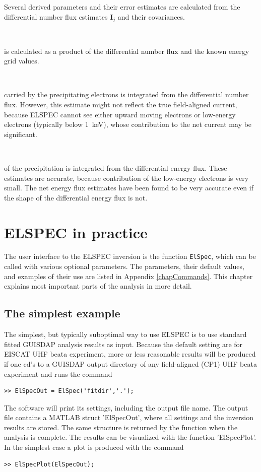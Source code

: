 \documentclass[12pt,a4paper]{report}
\begin{document}
Several derived parameters and their error estimates are calculated from the differential number flux estimates $\bm{I}_j$ and their covariances. 

~

 is calculated as a product of the differential number flux and the known energy grid values. 

~

 carried by the precipitating electrons is integrated from the differential number flux. However, this estimate might not reflect the true field-aligned current, because ELSPEC cannot see either upward moving electrons or low-energy electrons (typically below 1~keV), whose contribution to the net current may be significant.

~

 of the precipitation is integrated from the differential energy flux. These estimates are accurate, because contribution of the low-energy electrons is very small. The net energy flux estimates have been found to be very accurate even if the shape of the differential energy flux is not. 





\chapter{ELSPEC in practice}

The user interface to the ELSPEC inversion is the function \verb|ElSpec|, which can be called with various optional parameters. The parameters, their default values, and examples of their use are listed in Appendix \ref{chapCommands}. This chapter explains most important parts of the analysis in more detail. 


\section{The simplest example}

The simplest, but typically suboptimal way to use ELSPEC is to use standard fitted GUISDAP analysis results as input. Because the default setting are for EISCAT UHF beata experiment, more or less reasonable results will be produced if one cd's to a GUISDAP output directory of any field-aligned (CP1) UHF beata experiment and runs the command
\begin{lstlisting}[style=myMATLAB]
>> ElSpecOut = ElSpec('fitdir','.');
\end{lstlisting}
The software will print its settings, including the output file name. The output file contains a MATLAB struct 'ElSpecOut', where all settings and the inversion results are stored. The same structure is returned by the function when the analysis is complete.  The results can be visualized with the function 'ElSpecPlot'. In the simplest case a plot is produced with the command
\begin{lstlisting}[style=myMATLAB]
>> ElSpecPlot(ElSpecOut);
\end{lstlisting}
\end{document}
